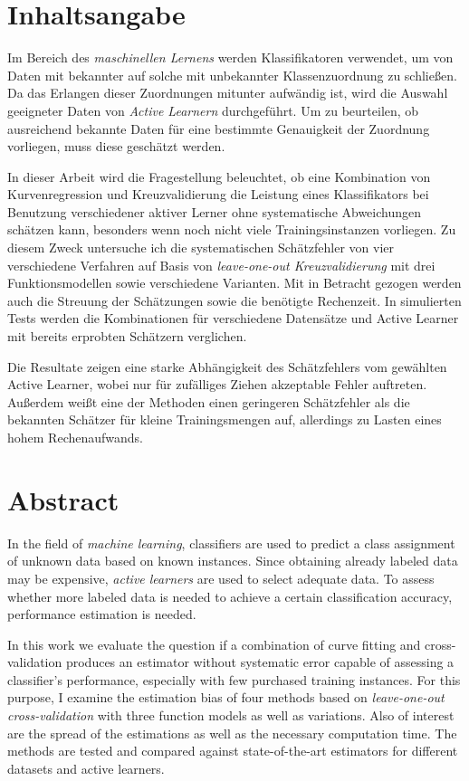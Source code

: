 \chapter*{Inhaltsangabe}

Im Bereich des \textit{maschinellen Lernens} werden Klassifikatoren verwendet, um von Daten mit bekannter auf solche mit unbekannter Klassenzuordnung zu schließen. Da das Erlangen dieser Zuordnungen mitunter aufwändig ist, wird die Auswahl geeigneter Daten von \textit{Active Learnern} durchgeführt. Um zu beurteilen, ob ausreichend bekannte Daten für eine bestimmte Genauigkeit der Zuordnung vorliegen, muss diese geschätzt werden.

In dieser Arbeit wird die Fragestellung beleuchtet, ob eine Kombination von Kurvenregression und Kreuzvalidierung die Leistung eines Klassifikators bei Benutzung verschiedener aktiver Lerner ohne systematische Abweichungen schätzen kann, besonders wenn noch nicht viele Trainingsinstanzen vorliegen. Zu diesem Zweck untersuche ich die systematischen Schätzfehler von vier verschiedene Verfahren auf Basis von \textit{leave-one-out Kreuzvalidierung} mit drei Funktionsmodellen sowie verschiedene Varianten. Mit in Betracht gezogen werden auch die Streuung der Schätzungen sowie die benötigte Rechenzeit. In simulierten Tests werden die Kombinationen für verschiedene Datensätze und Active Learner mit bereits erprobten Schätzern verglichen.

Die Resultate zeigen eine starke Abhängigkeit des Schätzfehlers vom gewählten Active Learner, wobei nur für zufälliges Ziehen akzeptable Fehler auftreten. Außerdem weißt eine der Methoden einen geringeren Schätzfehler als die bekannten Schätzer für kleine Trainingsmengen auf, allerdings zu Lasten eines hohem Rechenaufwands.


\chapter*{Abstract}

In the field of \textit{machine learning}, classifiers are used to predict a class assignment of unknown data based on known instances. Since obtaining already labeled data may be expensive, \textit{active learners} are used to select adequate data. To assess whether more labeled data is needed to achieve a certain classification accuracy, performance estimation is needed.

In this work we evaluate the question if a combination of curve fitting and cross-validation produces an estimator without systematic error capable of assessing a classifier's performance, especially with few purchased training instances. For this purpose, I examine the estimation bias of four methods based on \textit{leave-one-out cross-validation} with three function models as well as variations. Also of interest are the spread of the estimations as well as the necessary computation time. The methods are tested and compared against state-of-the-art estimators for different datasets and active learners.


